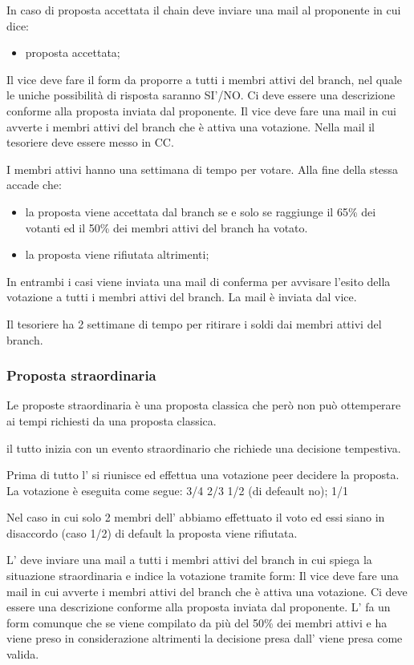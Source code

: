\documentclass[pdf]{article}
\theoremstyle{definition}
\begin{document}
In caso di proposta accettata il chain deve inviare una mail al proponente in cui dice:
\begin{itemize}
	\item proposta accettata;
\end{itemize}

Il vice deve fare il form da proporre a tutti i membri attivi del branch, nel quale le uniche possibilità di risposta saranno SI'/NO. Ci deve essere una descrizione conforme alla proposta inviata dal proponente. 
Il vice deve fare una mail in cui avverte i membri attivi del branch che è attiva una votazione. Nella mail il tesoriere deve essere messo in CC.

I membri attivi hanno una settimana di tempo per votare. Alla fine della stessa accade che:

\begin{itemize}
	\item la proposta viene accettata dal branch se e solo se raggiunge il 65\% dei votanti ed il 50\% dei membri attivi del branch ha votato.
	\item la proposta viene rifiutata altrimenti;
\end{itemize}

In entrambi i casi viene inviata una mail di conferma per  avvisare l'esito della votazione a tutti i membri attivi del branch. La mail è inviata dal vice.

Il tesoriere ha 2 settimane di tempo per ritirare i soldi dai membri attivi del branch.

\subsubsection{Proposta straordinaria}

Le proposte straordinaria è una proposta classica che però non può ottemperare ai tempi richiesti da una proposta classica.

il tutto inizia con un evento straordinario che richiede una decisione tempestiva.

Prima di tutto l'\EC{} si riunisce ed effettua una votazione peer decidere la proposta.
La votazione è eseguita come segue:
3/4
2/3
1/2 (di defeault no);
1/1

Nel caso in cui solo 2 membri dell'\EC{} abbiamo effettuato il voto ed essi siano in disaccordo (caso 1/2) di default la proposta viene rifiutata.

L'\EC{} deve inviare una mail a tutti i membri attivi del branch in cui spiega la situazione straordinaria e indice la votazione tramite form: 
Il vice deve fare una mail in cui avverte i membri attivi del branch che è attiva una votazione. Ci deve essere una descrizione conforme alla proposta inviata dal proponente. 
L'\EC{} fa un form comunque che se viene compilato da più del 50\% dei membri attivi e ha viene preso in considerazione altrimenti la decisione presa dall'\EC{} viene presa come valida.
\end{document}

